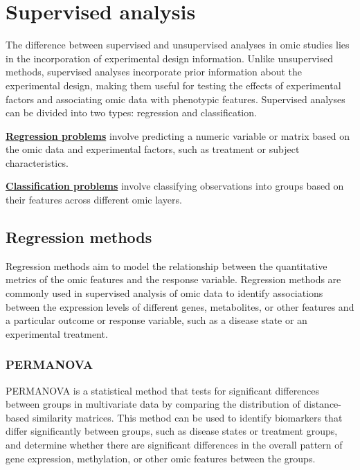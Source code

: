 \documentclass[
]{book}
\begin{document}
\normalsize

\hypertarget{supervised-analysis}{%
\chapter{Supervised analysis}\label{supervised-analysis}}

The difference between supervised and unsupervised analyses in omic studies lies in the incorporation of experimental design information. Unlike unsupervised methods, supervised analyses incorporate prior information about the experimental design, making them useful for testing the effects of experimental factors and associating omic data with phenotypic features. Supervised analyses can be divided into two types: regression and classification.

\textbf{\protect\hyperlink{regression-methods}{Regression problems}} involve predicting a numeric variable or matrix based on the omic data and experimental factors, such as treatment or subject characteristics.

\textbf{\protect\hyperlink{classification-methods}{Classification problems}} involve classifying observations into groups based on their features across different omic layers.

\hypertarget{regression-methods}{%
\section{Regression methods}\label{regression-methods}}

Regression methods aim to model the relationship between the quantitative metrics of the omic features and the response variable. Regression methods are commonly used in supervised analysis of omic data to identify associations between the expression levels of different genes, metabolites, or other features and a particular outcome or response variable, such as a disease state or an experimental treatment.

\hypertarget{permanova}{%
\subsection{PERMANOVA}\label{permanova}}

PERMANOVA is a statistical method that tests for significant differences between groups in multivariate data by comparing the distribution of distance-based similarity matrices. This method can be used to identify biomarkers that differ significantly between groups, such as disease states or treatment groups, and determine whether there are significant differences in the overall pattern of gene expression, methylation, or other omic features between the groups.
\end{document}
